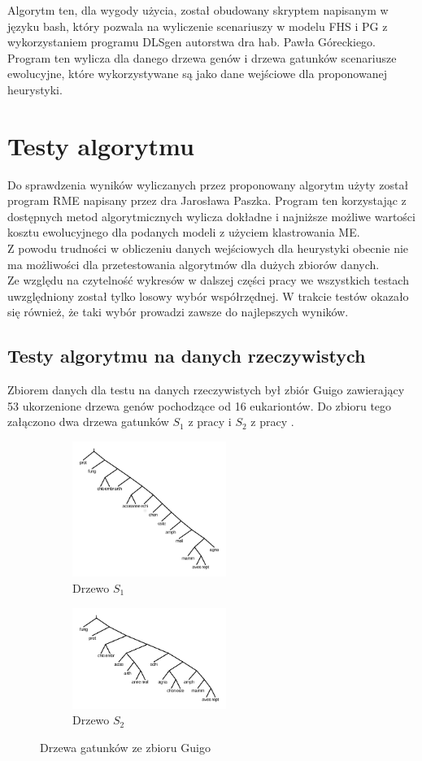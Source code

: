 \documentclass[licencjacka]{pracamgr}
\begin{document}
Algorytm ten, dla wygody użycia, został obudowany skryptem napisanym w języku bash, który pozwala na wyliczenie scenariuszy w modelu FHS i PG z wykorzystaniem programu DLSgen autorstwa dra hab. Pawła Góreckiego.\cite{dlsgen} Program ten wylicza dla danego drzewa genów i drzewa gatunków scenariusze ewolucyjne, które wykorzystywane są jako dane wejściowe dla proponowanej heurystyki.


\section{Testy algorytmu}
Do sprawdzenia wyników wyliczanych przez proponowany algorytm użyty został program RME napisany przez dra Jarosława Paszka. Program ten korzystając z dostępnych metod algorytmicznych wylicza dokładne i najniższe możliwe wartości kosztu ewolucyjnego dla podanych modeli z użyciem klastrowania ME. \cite{rme}
\\
Z powodu trudności w obliczeniu danych wejściowych dla heurystyki obecnie nie ma możliwości dla przetestowania algorytmów dla dużych zbiorów danych.
\\
Ze względu na czytelność wykresów w dalszej części pracy we wszystkich testach uwzględniony został tylko losowy wybór współrzędnej. W trakcie testów okazało się również, że taki wybór prowadzi zawsze do najlepszych wyników. 


\subsection{Testy algorytmu na danych rzeczywistych}
Zbiorem danych dla testu na danych rzeczywistych był zbiór Guigo zawierający 53 ukorzenione drzewa genów pochodzące od 16 eukariontów. Do zbioru tego załączono dwa drzewa gatunków $S_1$ z pracy \cite{guigo} i $S_2$ z pracy \cite{guigo_2}. 

\begin{figure}[H]
\centering
\begin{subfigure}{.5\textwidth}
  \centering
  \includegraphics[width=50mm]{./pictures/guigo_spec_1.png}
  \caption{Drzewo $S_1$}
\end{subfigure}%
\begin{subfigure}{.5\textwidth}
  \centering
  \includegraphics[width=50mm]{./pictures/guigo_spec_2.png}
  \caption{Drzewo $S_2$}
\end{subfigure}%
\caption{Drzewa gatunków ze zbioru Guigo}
\end{figure}
\end{document}
